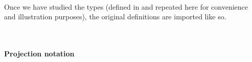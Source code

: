 \begin{code}
\>[1]\AgdaSpace{}%
\AgdaSymbol{:}\AgdaSpace{}%
\AgdaSymbol{(}\AgdaSpace{}%
\AgdaSymbol{:}\AgdaSpace{}%
\AgdaSpace{}%
\AgdaSpace{}%
\AgdaSymbol{)(}\AgdaSpace{}%
\AgdaSymbol{:}\AgdaSpace{}%
\AgdaSpace{}%
\AgdaSpace{}%
\AgdaSpace{}%
\AgdaSpace{}%
\AgdaSymbol{)}\AgdaSpace{}%
\AgdaSpace{}%
\AgdaSpace{}%
\AgdaSpace{}%
\AgdaSpace{}%
\<%
\\
%
\>[1]\AgdaSpace{}%
\AgdaSpace{}%
\AgdaSpace{}%
\AgdaSymbol{=}\AgdaSpace{}%
\AgdaSpace{}%
\<%
\\
%
\\[\AgdaEmptyExtraSkip]%
\>[1]\AgdaSpace{}%
\AgdaSpace{}%
\AgdaSpace{}%
\AgdaSpace{}%
\AgdaSpace{}%
\AgdaSpace{}%
\AgdaSymbol{)}\AgdaSpace{}%
\AgdaSymbol{=}\AgdaSpace{}%
\AgdaSpace{}%
\AgdaSpace{}%
\AgdaSpace{}%
\AgdaSpace{}%
\AgdaFunction{,}\AgdaSpace{}%
\<%
\end{code}
\ccpad
Once we have studied the types (defined in \typtop and repeated here for convenience and illustration purposes), the original definitions are imported like so.
\ccpad
\begin{code}%
\>[0]\AgdaSpace{}%
\AgdaSpace{}%
\AgdaSpace{}%
\<%
\\
\>[0]\AgdaSpace{}%
\AgdaSpace{}%
\AgdaSpace{}%
\AgdaSpace{}%
\AgdaSymbol{(}\AgdaSymbol{;}\AgdaSpace{}%
\AgdaSymbol{;}\AgdaSpace{}%
\AgdaSymbol{;}\AgdaSpace{}%
\AgdaSymbol{;}\AgdaSpace{}%
\AgdaSymbol{;}\AgdaSpace{}%
\AgdaSymbol{)}\AgdaSpace{}
\<%
\end{code}

\paragraph*{Projection notation}

